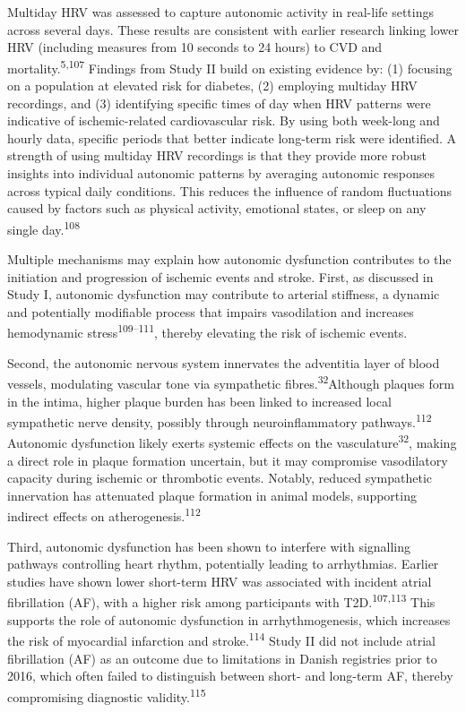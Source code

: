 \documentclass[
  a4paper,
  headsepline=true,
  open=any]{scrbook}
\begin{document}
Multiday HRV was assessed to capture autonomic activity in real-life
settings across several days. These results are consistent with earlier
research linking lower HRV (including measures from 10 seconds to 24
hours) to CVD and mortality.\textsuperscript{5,107} Findings from Study
II build on existing evidence by: (1) focusing on a population at
elevated risk for diabetes, (2) employing multiday HRV recordings, and
(3) identifying specific times of day when HRV patterns were indicative
of ischemic-related cardiovascular risk. By using both week-long and
hourly data, specific periods that better indicate long-term risk were
identified. A strength of using multiday HRV recordings is that they
provide more robust insights into individual autonomic patterns by
averaging autonomic responses across typical daily conditions. This
reduces the influence of random fluctuations caused by factors such as
physical activity, emotional states, or sleep on any single
day.\textsuperscript{108}

Multiple mechanisms may explain how autonomic dysfunction contributes to
the initiation and progression of ischemic events and stroke. First, as
discussed in Study I, autonomic dysfunction may contribute to arterial
stiffness, a dynamic and potentially modifiable process that impairs
vasodilation and increases hemodynamic stress\textsuperscript{109--111},
thereby elevating the risk of ischemic events.

Second, the autonomic nervous system innervates the adventitia layer of
blood vessels, modulating vascular tone via sympathetic
fibres.\textsuperscript{32}Although plaques form in the intima, higher
plaque burden has been linked to increased local sympathetic nerve
density, possibly through neuroinflammatory
pathways.\textsuperscript{112} Autonomic dysfunction likely exerts
systemic effects on the vasculature\textsuperscript{32}, making a direct
role in plaque formation uncertain, but it may compromise vasodilatory
capacity during ischemic or thrombotic events. Notably, reduced
sympathetic innervation has attenuated plaque formation in animal
models, supporting indirect effects on
atherogenesis.\textsuperscript{112}

Third, autonomic dysfunction has been shown to interfere with signalling
pathways controlling heart rhythm, potentially leading to arrhythmias.
Earlier studies have shown lower short-term HRV was associated with
incident atrial fibrillation (AF), with a higher risk among participants
with T2D.\textsuperscript{107,113} This supports the role of autonomic
dysfunction in arrhythmogenesis, which increases the risk of myocardial
infarction and stroke.\textsuperscript{114} Study II did not include
atrial fibrillation (AF) as an outcome due to limitations in Danish
registries prior to 2016, which often failed to distinguish between
short- and long-term AF, thereby compromising diagnostic
validity.\textsuperscript{115}
\end{document}
